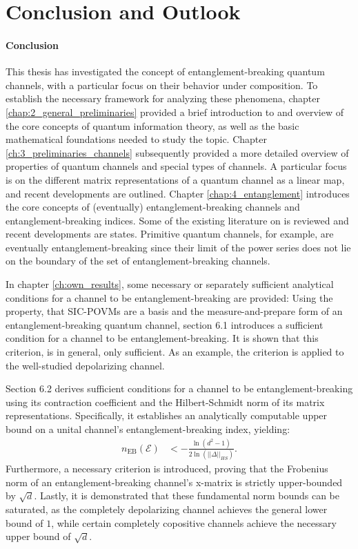 \chapter{Conclusion and Outlook}
\label{chap:conclusion}
\subsubsection{Conclusion}
This thesis has investigated the concept of entanglement-breaking quantum channels, with a particular focus on their behavior under composition. To establish the necessary framework for analyzing these phenomena, chapter \ref{chap:2_general_preliminaries} provided a brief introduction to and overview of the core concepts of quantum information theory, as well as the basic mathematical foundations needed to study the topic. Chapter \ref{ch:3_preliminaries_channels} subsequently provided a more detailed overview of properties of quantum channels and special types of channels. A particular focus is on the different matrix representations of a quantum channel as a linear map, and recent developments are outlined. Chapter \ref{chap:4_entanglement} introduces the core concepts of (eventually) entanglement-breaking channels and entanglement-breaking indices. Some of the existing literature on is reviewed and recent developments are states. Primitive quantum channels, for example, are eventually entanglement-breaking since their limit of the power series does not lie on the boundary of the set of entanglement-breaking channels.

In chapter \ref{ch:own_results}, some necessary or separately sufficient analytical conditions for a channel to be entanglement-breaking are provided: Using the property, that SIC-POVMs are a basis and the measure-and-prepare form of an entanglement-breaking quantum channel, section 6.1 introduces a sufficient condition for a channel to be entanglement-breaking. It is shown that this criterion, is in general, only sufficient. As an example, the criterion is applied to the well-studied depolarizing channel. 

Section 6.2 derives sufficient conditions for a channel to be entanglement-breaking using its contraction coefficient and the Hilbert-Schmidt norm of its matrix representations. Specifically, it establishes an analytically computable upper bound on a unital channel's entanglement-breaking index, yielding:
\begin{align*}
    n_\text{EB}(\mathcal{E}) &< -\frac{\ln(d^2-1)}{2\ln(||\Delta||_{HS})}.
\end{align*}
Furthermore, a necessary criterion is introduced, proving that the Frobenius norm of an entanglement-breaking channel's x-matrix is strictly upper-bounded by $\sqrt{d}$. Lastly, it is demonstrated that these fundamental norm bounds can be saturated, as the completely depolarizing channel achieves the general lower bound of $1$, while certain completely copositive channels achieve the necessary upper bound of $\sqrt{d}$.

